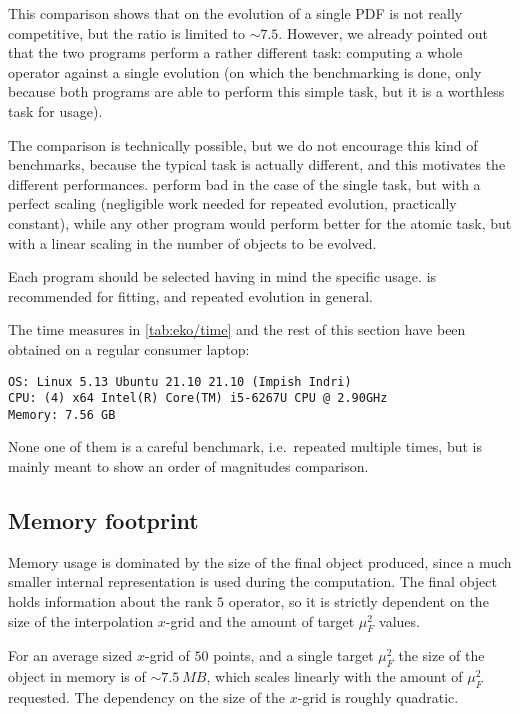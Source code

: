 This comparison shows that on the evolution of a single PDF \eko{} is not
really competitive, but the ratio is limited to $\sim 7.5$. 
However, we already pointed out that the two programs perform a rather
different task: computing a whole operator against a single \pdf{} evolution
(on which the benchmarking is done, only because both programs are able to
perform this simple task, but it is a worthless task for \eko{} usage).

The comparison is technically possible, but we do not encourage this kind of
benchmarks, because the typical task is actually different, and this motivates
the different performances.
\eko{} perform bad in the case of the single task, but with a perfect scaling
(negligible work needed for repeated evolution, practically constant), while
any other program would perform better for the atomic task, but with a linear
scaling in the number of objects to be evolved.

Each program should be selected having in mind the specific usage. \eko{} is
recommended for \pdf{} fitting, and repeated evolution in general.

The time measures in \cref{tab:eko/time} and the rest of this
section have been obtained on a regular consumer laptop:
\begin{verbatim}
OS: Linux 5.13 Ubuntu 21.10 21.10 (Impish Indri)
CPU: (4) x64 Intel(R) Core(TM) i5-6267U CPU @ 2.90GHz
Memory: 7.56 GB
\end{verbatim}
None one of them is a careful benchmark, i.e.\ repeated multiple times, but is mainly
meant to show an order of magnitudes comparison.

\subsection{Memory footprint}
\label{sec:eko/memory}

Memory usage is dominated by the size of the final object produced,
since a much smaller internal representation is used during the computation.
The final object holds information about the rank $5$ operator, so it is
strictly dependent on the size of the interpolation $x$-grid and the amount of
target $\mu_F^2$ values.

For an average sized $x$-grid of $50$ points, and a single target $\mu_F^2$ the
size of the object in memory is of $\sim \SI{7.5}{MB}$, which scales linearly
with the amount of $\mu_F^2$ requested.
The dependency on the size of the $x$-grid is roughly quadratic.

